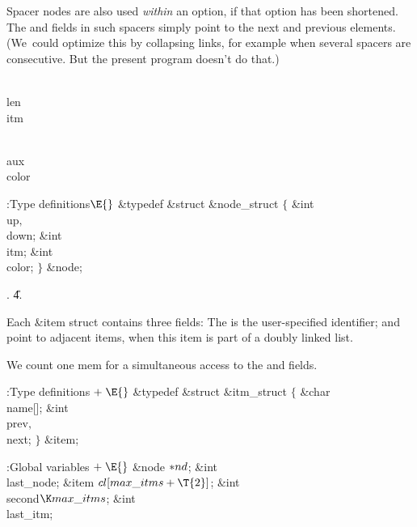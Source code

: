 Spacer nodes are also used {\it within\/} an option, if that option
has been shortened. The  and  fields in such spacers
simply point to the next and previous elements. (We~could optimize
this by collapsing links, for example when several spacers are
consecutive. But the present program doesn't do that.)

\Y\B\4\D\\{len}\5
\\{itm}\par
\B\4\D\\{aux}\5
\\{color}\par
\Y\B\4:Type definitions\X${}\E{}$\6
\&{typedef} \&{struct} \&{node\_struct} ${}\{{}$\1\6
\&{int} \\{up}${},{}$ \\{down};\6
\&{int} \\{itm};\6
\&{int} \\{color};\2\6
${}\}{}$ \&{node};\par
{}.
\U4.\fi

Each \&{item} struct contains three fields:
The  is the user-specified identifier;
 and  point to adjacent items, when this
item is part of a doubly linked list.

We count one mem for a simultaneous access to the  and  fields.

\Y\B\4:Type definitions\X${}\mathrel+\E{}$\6
\&{typedef} \&{struct} \&{itm\_struct} ${}\{{}$\1\6
\&{char} \\{name}[];\6
\&{int} \\{prev}${},{}$ \\{next};\2\6
${}\}{}$ \&{item};\par
\fi

\B{}:Global variables\X${}\mathrel+\E{}$\6
\&{node} ${}{*}\\{nd}{}$;\6
\&{int} \\{last\_node};\6
\&{item} ${}\\{cl}[\\{max\_itms}+\T{2}]{}$;\6
\&{int} \\{second}${}\K\\{max\_itms}{}$;\6
\&{int} \\{last\_itm};%
\par
\fi

